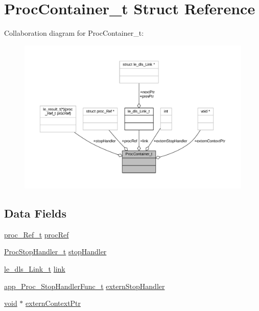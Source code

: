 \hypertarget{struct_proc_container__t}{}\section{Proc\+Container\+\_\+t Struct Reference}
\label{struct_proc_container__t}


Collaboration diagram for Proc\+Container\+\_\+t\+:
\nopagebreak
\begin{figure}[H]
\begin{center}
\leavevmode
\includegraphics[width=350pt]{struct_proc_container__t__coll__graph}
\end{center}
\end{figure}
\subsection*{Data Fields}
\begin{DoxyCompactItemize}
\item 
\hyperlink{proc_8h_a88e732e553d7fcbe7c9f9278ec9defbf}{proc\+\_\+\+Ref\+\_\+t} \hyperlink{struct_proc_container__t_a4d029ff176a4af8e6a38826a42a3f44e}{proc\+Ref}
\item 
\hyperlink{supervisor_2app_8c_ac80a0c9c9987ce26f3d77d5c7a77b2f9}{Proc\+Stop\+Handler\+\_\+t} \hyperlink{struct_proc_container__t_af28816ad5c97cf6f3edd300a487f93b0}{stop\+Handler}
\item 
\hyperlink{structle__dls___link__t}{le\+\_\+dls\+\_\+\+Link\+\_\+t} \hyperlink{struct_proc_container__t_a1dfe547fdb680a9800a3b186e953fecf}{link}
\item 
\hyperlink{daemons_2linux_2supervisor_2app_8h_a245045f131afb5d97267fb97a9923840}{app\+\_\+\+Proc\+\_\+\+Stop\+Handler\+Func\+\_\+t} \hyperlink{struct_proc_container__t_a62cc4860836476a0aca8388815a693fb}{extern\+Stop\+Handler}
\item 
\hyperlink{_t_e_m_p_l_a_t_e__cdef_8h_ac9c84fa68bbad002983e35ce3663c686}{void} $\ast$ \hyperlink{struct_proc_container__t_a0c616edabda33fefc6d61acc4811fad0}{extern\+Context\+Ptr}
\end{DoxyCompactItemize}


